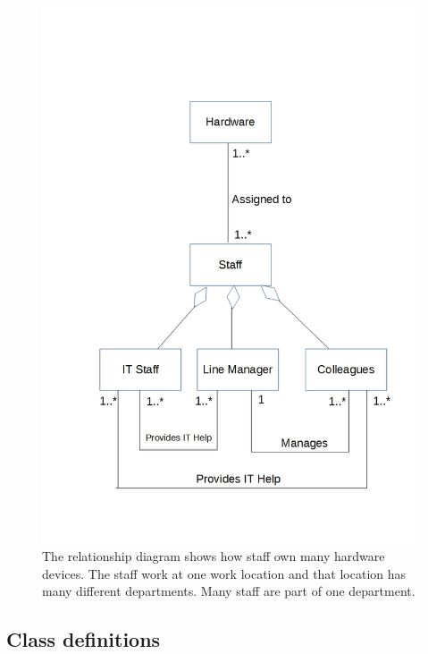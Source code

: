 \begin{figure}[H]
\hspace*{-1.3cm}
\vspace*{-1cm}
\includegraphics[width=1\textwidth]{RelationshipDiagram.jpg}
\caption{The relationship diagram shows how staff own many hardware devices. The staff work at one work location and that location has many different departments. Many staff are part of one department. } \label{Relationship Diagrams}
\end{figure}

\subsection{Class definitions}

